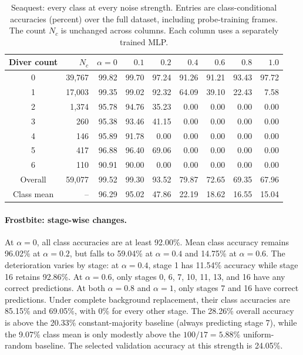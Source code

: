 \documentclass{article} %
\begin{document}
\begin{table}[!t]
\centering
\small
\setlength{\tabcolsep}{4pt}
\caption{Seaquest: every class at every noise strength. Entries are class-conditional accuracies (percent) over the full dataset, including probe-training frames. The count $N_c$ is unchanged across columns. Each column uses a separately trained MLP.}
\label{tab:per_class_noise}
\begin{tabular}{crrrrrrrr}
\toprule
Diver count & $N_c$ & $\alpha=0$ & $0.1$ & $0.2$ & $0.4$ & $0.6$ & $0.8$ & $1.0$ \\
\midrule
0 & 39,767 & 99.82 & 99.70 & 97.24 & 91.26 & 91.21 & 93.43 & 97.72 \\
1 & 17,003 & 99.35 & 99.02 & 92.32 & 64.09 & 39.10 & 22.43 & 7.58 \\
2 & 1,374 & 95.78 & 94.76 & 35.23 & 0.00 & 0.00 & 0.00 & 0.00 \\
3 & 260 & 95.38 & 93.46 & 41.15 & 0.00 & 0.00 & 0.00 & 0.00 \\
4 & 146 & 95.89 & 91.78 & 0.00 & 0.00 & 0.00 & 0.00 & 0.00 \\
5 & 417 & 96.88 & 96.40 & 69.06 & 0.00 & 0.00 & 0.00 & 0.00 \\
6 & 110 & 90.91 & 90.00 & 0.00 & 0.00 & 0.00 & 0.00 & 0.00 \\
\midrule
Overall & 59,077 & 99.52 & 99.30 & 93.52 & 79.87 & 72.65 & 69.35 & 67.96 \\
Class mean & -- & 96.29 & 95.02 & 47.86 & 22.19 & 18.62 & 16.55 & 15.04 \\
\bottomrule
\end{tabular}
\end{table}

\paragraph{Frostbite: stage-wise changes.}
At $\alpha=0$, all class accuracies are at least 92.00\%. Mean class accuracy remains 96.02\% at $\alpha=0.2$, but falls to 59.04\% at $\alpha=0.4$ and 14.75\% at $\alpha=0.6$. The deterioration varies by stage: at $\alpha=0.4$, stage 1 has 11.54\% accuracy while stage 16 retains 92.86\%. At $\alpha=0.6$, only stages 0, 6, 7, 10, 11, 13, and 16 have any correct predictions. At both $\alpha=0.8$ and $\alpha=1$, only stages 7 and 16 have correct predictions. Under complete background replacement, their class accuracies are 85.15\% and 69.05\%, with 0\% for every other stage. The 28.26\% overall accuracy is above the 20.33\% constant-majority baseline (always predicting stage 7), while the 9.07\% class mean is only modestly above the $100/17=5.88\%$ uniform-random baseline. The selected validation accuracy at this strength is 24.05\%.
\end{document}
